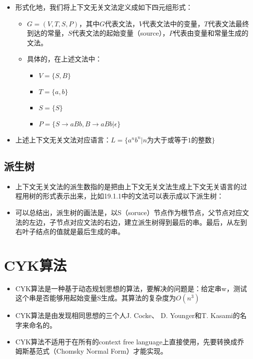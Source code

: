 \begin{itemize}
\item
  形式化地，我们将上下文无关文法定义成如下四元组形式：

  \begin{itemize}
  \item
    \(G=(V,T,S,P)\)，其中\(G\)代表文法，\(V\)代表文法中的变量，\(T\)代表文法最终到达的常量，\(S\)代表文法的起始变量（source），\(P\)代表由变量和常量生成的文法。
  \item
    具体的，在上述文法中：

    \begin{itemize}
    \item
      \(V=\{S,B\}\)
    \item
      \(T=\{a,b\}\)
    \item
      \(S=\{S\}\)
    \item
      \(P=\{S\rightarrow aBb , B\rightarrow aBb|\epsilon\}\)
    \end{itemize}
  \end{itemize}
\item
  上述上下文无关文法对应语言：\(L=\{a^nb^n|n为大于或等于1的整数\}\)
\end{itemize}

\subsection{派生树}\label{header-n1186}

\begin{itemize}
\item
  上下文无关文法的派生数指的是把由上下文无关文法生成上下文无关语言的过程用树的形式表示出来，比如19.1.1中的文法可以表示成以下派生树：
\end{itemize}

\begin{itemize}
\item
  可以总结出，派生树的画法是，以S（soruce）节点作为根节点，父节点对应文法的左边，子节点对应文法的右边，建立派生树得到最后的串。最后，从左到右叶子结点的值就是最后生成的串。
\end{itemize}

\section{CYK算法}\label{header-n1194}

\begin{itemize}
\item
  CYK算法是一种基于动态规划思想的算法，要解决的问题是：给定串w，测试这个串是否能够用起始变量S生成。其算法的复杂度为\(O(n^3)\)
\item
  CYK算法是由发现相同思想的三个人J. Cocke、 D. Younger和T.
  Kasami的名字来命名的。
\item
  CYK算法不适用于在所有的context free
  language上直接使用，先要转换成乔姆斯基范式（Chomsky Normal
  Form）才能实现。
\end{itemize}

